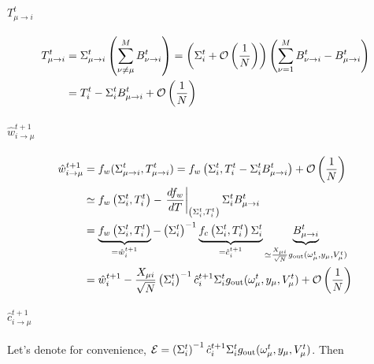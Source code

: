 \documentclass[aip,jmp,amsmath,amssymb,reprint]{revtex4}
\begin{document}
\paragraph{$T_{\mu \to i}^t$}
\begin{align*}
	T_{\mu \to i}^t &= \Sigma_{\mu \to i}^t  \left( \sum\limits_{\nu \ne \mu}^M  B_{\nu \to i}^t \right) 
	= \left( \Sigma_{i  }^t + {\cal O}\left(\frac{1}{N}\right) \right) \left( \sum\limits_{\nu =1}^M  B_{\nu \to i}^t -  B_{\mu \to i}^t \right) \\
	&= T_{i}^t - \Sigma_{i  }^t B_{\mu \to i}^t + {\cal O}\left(\frac{1}{N}\right)
\end{align*}

\paragraph{$\hat{w}_{i\to \mu}^{t+1}$}
\begin{align*}
	\hat{w}_{i\to \mu}^{t+1} &= f_w( \Sigma_{\mu \to i}^t , T_{\mu \to i}^t ) = f_w\left( \Sigma_{i  }^t  , T_{i}^t - \Sigma_{i  }^t B_{\mu \to i}^t  \right) + {\cal O}\left(\frac{1}{N}\right)\\
	&\simeq f_w\left( \Sigma_{i  }^t  , T_{i}^t  \right) -      \left.\frac{d f_w}{d T}  \right|_{\left(\Sigma_{i  }^t ,T_{i}^t\right)}\Sigma_{i  }^t B_{\mu \to i}^t \\
	&= \underbrace{f_w\left( \Sigma_{i  }^t  , T_{i}^t  \right)}_{=\hat{w}_{i}^{t+1}} - \left(\Sigma_{i  }^t\right)^{-1} \underbrace{f_c \left(\Sigma_{i  }^t, T_{i}^t \right) \Sigma_{i  }^t}_{=\hat{c}_{i}^{t+1}} \underbrace{B_{\mu \to i}^t}_{\simeq \frac{X_{\mu i}}{\sqrt{N}} g_{\rm out} (\omega_{\mu}^t, y_{\mu}, V_{\mu}^t)}\\
	&= \hat{w}_{i}^{t+1} - \frac{X_{\mu i}}{\sqrt{N}} \left(\Sigma_{i  }^t\right)^{-1}\hat{c}_{i}^{t+1}\Sigma_{i  }^tg_{\rm out} (\omega_{\mu}^t, y_{\mu}, V_{\mu}^t) + {\cal O}\left( \frac{1}{N} \right)
\end{align*}

\paragraph{$\hat{c}_{i\to \mu}^{t+1}$\\}
Let's denote for convenience, $\mathcal{E} = \left(\Sigma_{i  }^t\right)^{-1}\hat{c}_{i}^{t+1}\Sigma_{i  }^tg_{\rm out} (\omega_{\mu}^t, y_{\mu}, V_{\mu}^t)$. Then
\end{document}
